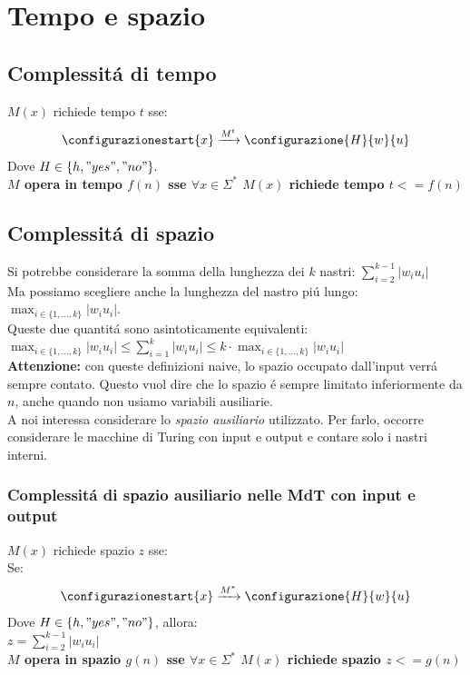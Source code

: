 \section{Tempo e spazio}

\subsection{Complessitá di tempo}
$M(x)$ richiede tempo $t$ sse:
\[
\configurazionestart{x} \xrightarrow{M^t} \configurazione{H}{w}{u}
\]
Dove $H \in \{h, "yes", "no"\}. $\\

\textbf{$M$ opera in tempo $f(n)$ sse $\forall x \in \Sigma^*$ $M(x)$ richiede tempo $t <= f(n)$} \\

\subsection{Complessitá di spazio}
Si potrebbe considerare la somma della lunghezza dei $k$ nastri: $\sum_{i=2}^{k-1} |w_i u_i|$ \\
Ma possiamo scegliere anche la lunghezza del nastro piú lungo: $\max_{i \in \{1, \dots, k\}} |w_i u_i|$. \\
Queste due quantitá sono asintoticamente equivalenti:\\
$\max_{i \in \{1, \dots, k\}} |w_i u_i| \leq  \sum_{i=1}^{k} |w_i u_i| \leq k \cdot \max_{i \in \{1, \dots, k\}} |w_i u_i|$  \\

\textbf{Attenzione:} con queste definizioni naive, lo spazio occupato dall'input verrá sempre contato.
Questo vuol dire che lo spazio é sempre limitato inferiormente da $n$, anche quando non usiamo variabili ausiliarie. \\
A noi interessa considerare lo \textit{spazio ausiliario} utilizzato. Per farlo, occorre considerare le macchine di Turing con input e output e contare solo i nastri interni. \\

\subsubsection{Complessitá di spazio ausiliario nelle MdT con input e output}
$M(x)$ richiede spazio $z$ sse: \\
Se:
\[
\configurazionestart{x} \xrightarrow{M^*} \configurazione{H}{w}{u}
\]
Dove $H \in \{h, "yes", "no"\}$, allora: \\
$z = \sum_{i=2}^{k-1} |w_i u_i|$ \\

\textbf{$M$ opera in spazio $g(n)$ sse $\forall x \in \Sigma^*$ $M(x)$ richiede spazio $z <= g(n)$} \\
